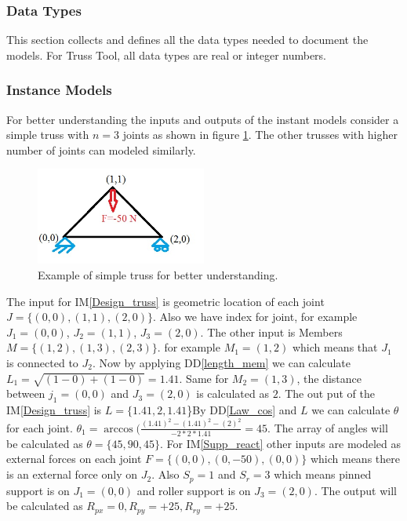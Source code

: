 \documentclass[12pt]{article}
\newcommand{\ddref}[1]{DD\ref{#1}}
\newcommand{\iref}[1]{IM\ref{#1}}
\begin{document}
\subsubsection{Data Types}\label{sec_datatypes}

This section collects and defines all the data types needed to document the models. For Truss Tool, all data types are real or integer numbers.

\subsubsection{Instance Models} \label{sec_instance}    

For better understanding the inputs and outputs of the instant models consider a simple truss with $n=3$ joints as shown in figure \ref{fig_example}. The other trusses with higher number of joints can modeled similarly.
\begin{figure}[h!]
\begin{center}
 
  \includegraphics[width=0.5\textwidth]{example.jpg}
 
 \caption{Example of simple truss for better understanding.}
 \label{fig_example}
 \end{center}
 \end{figure}

The input for \iref{Design_truss} is geometric location of each joint $J=\{(0,0),(1,1),(2,0)\}$. Also we have index for joint, for example $J_{1} =(0,0)$, $J_{2} =(1,1)$, $J_{3} =(2,0)$. The other input is Members $M=\{(1,2),(1,3),(2,3)\}$. for example $M_{1} =(1,2)$ which means that $J_{1}$ is connected to $J_{2}$. Now by applying \ddref{length_mem} we can calculate 
$L_{1} =\sqrt{(1-0)+(1-0)} = 1.41 $. Same for $M_{2} =(1,3)$, the distance between $j_{1} =(0,0)$ and $J_{3} =(2,0)$ is calculated as $2$. The out put of the \iref{Design_truss} is 
$L=\{1.41,2,1.41$\}$
$By \ddref{Law_cos} and $L$ we can calculate $\theta$ for each joint. $\theta_{1} = \arccos(\frac{(1.41)^2-(1.41)^2-(2)^2}{-2*2*1.41} = 45$. The array of angles will be calculated as $\theta =\{ 45,90,45\}$. For \iref{Supp_react} other inputs are modeled as external forces on each joint $F=\{(0,0),(0,-50),(0,0)\}$ which means there is an external force only on $J_{2}$. Also $S_p =1 $ and $S_r =3 $ which means pinned support is on $J_{1} = (0,0)$ and roller support is on $J_{3} =(2,0)$. The output will be calculated as $R_{px} =0, R_{py}=+25, R_{ry}=+25$. 
\end{document}
